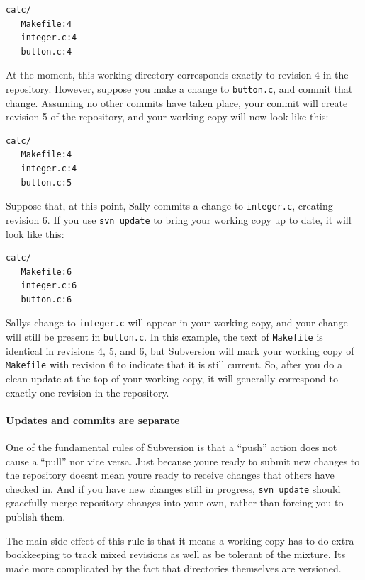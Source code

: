\begin{verbatim}
calc/
   Makefile:4
   integer.c:4
   button.c:4
\end{verbatim}

At the moment, this working directory corresponds exactly to revision 4
in the repository. However, suppose you make a change to
\texttt{button.c}, and commit that change. Assuming no other commits
have taken place, your commit will create revision 5 of the repository,
and your working copy will now look like this:

\begin{verbatim}
calc/
   Makefile:4
   integer.c:4
   button.c:5
\end{verbatim}

Suppose that, at this point, Sally commits a change to
\texttt{integer.c}, creating revision 6. If you use \texttt{svn\ update}
to bring your working copy up to date, it will look like this:

\begin{verbatim}
calc/
   Makefile:6
   integer.c:6
   button.c:6
\end{verbatim}

Sally\textquotesingle s change to \texttt{integer.c} will appear in your
working copy, and your change will still be present in
\texttt{button.c}. In this example, the text of \texttt{Makefile} is
identical in revisions 4, 5, and 6, but Subversion will mark your
working copy of \texttt{Makefile} with revision 6 to indicate that it is
still current. So, after you do a clean update at the top of your
working copy, it will generally correspond to exactly one revision in
the repository.

\paragraph{Updates and commits are
separate}\label{svn.basic.in-action.mixedrevs.update-commit}

One of the fundamental rules of Subversion is that a ``push'' action
does not cause a ``pull'' nor vice versa. Just because
you\textquotesingle re ready to submit new changes to the repository
doesn\textquotesingle t mean you\textquotesingle re ready to receive
changes that others have checked in. And if you have new changes still
in progress, \texttt{svn\ update} should gracefully merge repository
changes into your own, rather than forcing you to publish them.

The main side effect of this rule is that it means a working copy has to
do extra bookkeeping to track mixed revisions as well as be tolerant of
the mixture. It\textquotesingle s made more complicated by the fact that
directories themselves are versioned.

